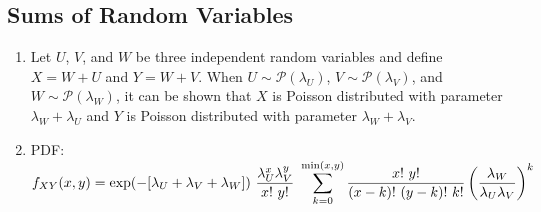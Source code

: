 \subsection{Sums of Random Variables}

\begin{enumerate}
    \item Let $U$, $V$, and $W$ be three independent random variables and define $X = W + U$ and $Y = W + V$. 
    When $U \sim \mathcal{P}(\lambda _U )$, $V \sim \mathcal{P}(\lambda _V )$, and $W \sim \mathcal{P}(\lambda _W )$, it can be shown that $X$ is Poisson distributed with parameter $\lambda _W + \lambda _U$ and $Y$ is Poisson distributed with parameter $\lambda _W + \lambda _V$. 
    \hfill \cite{statistics/book/Statistics-for-Data-Scientists/Maurits-Kaptein}

    \item PDF: 
    $
        f _{X Y} (x, y) 
        = \exp(-[\lambda _U + \lambda _V + \lambda _W ])\ \dfrac{\lambda ^x_U \lambda ^y_V} {x!\ y!}
        \ \dsum^{\min(x,y)} _{k=0} \dfrac{x!\ y! }{(x - k)!\ (y - k)!\ k!} \dParenBrac{\dfrac{\lambda _W }{\lambda _U \lambda _V} }^k
    $
    \hfill \cite{statistics/book/Statistics-for-Data-Scientists/Maurits-Kaptein}
\end{enumerate}








